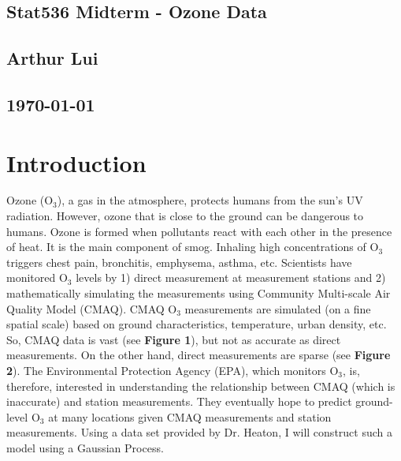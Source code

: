 \documentclass{article}                                                   %
\begin{document}
\begin{center}                                                            %
  \section*{\textbf{Stat536 Midterm - Ozone Data}}                        %
  \subsection*{\textbf{Arthur Lui}}                                       %
  \subsection*{\noindent\today}                                           %
\end{center}                                                              %

\section{Introduction}
  Ozone (O$_3$), a gas in the atmosphere, protects humans from the sun's UV
  radiation. However, ozone that is close to the ground can be dangerous to
  humans. Ozone is formed when pollutants react with each other in the presence
  of heat. It is the main component of smog. Inhaling high concentrations of
  O$_3$ triggers chest pain, bronchitis, emphysema, asthma, etc. Scientists have
  monitored O$_3$ levels by 1) direct measurement at measurement stations and 2)
  mathematically simulating the measurements using Community Multi-scale Air
  Quality Model (CMAQ). CMAQ O$_3$ measurements are simulated (on a fine spatial
  scale) based on ground characteristics, temperature, urban density, etc.  So,
  CMAQ data is vast (see \textbf{Figure 1}), but not as accurate as direct
  measurements. On the other hand, direct measurements are sparse (see
  \textbf{Figure 2}). The Environmental Protection Agency (EPA), which monitors
  O$_3$, is, therefore, interested in understanding the relationship between
  CMAQ (which is inaccurate) and station measurements. They eventually hope to
  predict ground-level O$_3$ at many locations given CMAQ measurements and
  station measurements. Using a data set provided by Dr.  Heaton, I will
  construct such a model using a Gaussian Process.
\end{document}
